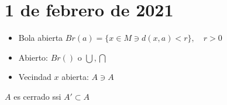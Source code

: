 \section{1 de febrero de 2021}

\begin{definition}
\begin{itemize}
    \item Bola abierta $Br(a)=\{x\in M\ni d(x,a)<r\},\quad r>0$
    \item Abierto: $Br()$ o $\bigcup,\bigcap$
    \item Vecindad $x$ abierta: $A\ni A$
\end{itemize}
\end{definition}

\begin{proposition}
$A$ es cerrado ssi $A'\subset A$
\end{proposition}

